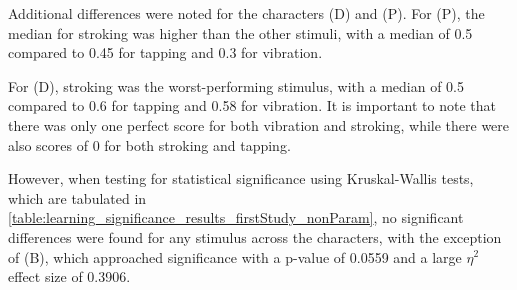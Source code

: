 Additional differences were noted for the characters (D) and (P). 
For (P), the median for stroking was higher than the other stimuli, with a median of 0.5 compared to 0.45 for tapping and 0.3 for vibration. 

For (D), stroking was the worst-performing stimulus, with a median of 0.5 compared to 0.6 for tapping and 0.58 for vibration. 
It is important to note that there was only one perfect score for both vibration and stroking, while there were also scores of 0 for both stroking and tapping.

However, when testing for statistical significance using Kruskal-Wallis tests, which are tabulated in \autoref{table:learning_significance_results_firstStudy_nonParam}, no significant differences were found for any stimulus across the characters, with the exception of (B), which approached significance with a p-value of 0.0559 and a large \(\eta^2\) effect size of 0.3906.


\begin{table}[ht]
\caption{Results of Kruskal-Wallis significance tests for the different Braille characters during testing with a $\eta^2$ Effect Size.}
\label{table:learning_significance_results_firstStudy_nonParam}
\end{table}





